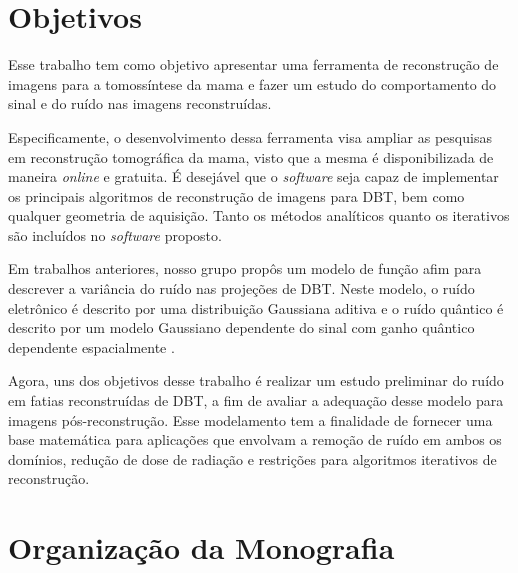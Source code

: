 
\section{Objetivos}

Esse trabalho tem como objetivo apresentar uma ferramenta de reconstrução de imagens para a tomossíntese da mama e fazer um estudo do comportamento do sinal e do ruído nas imagens reconstruídas.

Especificamente, o desenvolvimento dessa ferramenta visa ampliar as pesquisas em reconstrução tomográfica da mama, visto que a mesma é disponibilizada de maneira \textit{online} e gratuita. É desejável que o \textit{software} seja capaz de implementar os principais algoritmos de reconstrução de imagens para \acs{DBT}, bem como qualquer geometria de aquisição. Tanto os métodos analíticos quanto os iterativos são incluídos no \textit{software} proposto.

Em trabalhos anteriores, nosso grupo propôs um modelo de função afim para descrever a variância do ruído nas projeções de \acs{DBT}. Neste modelo, o ruído eletrônico é descrito por uma distribuição Gaussiana aditiva e o ruído quântico é descrito por um modelo Gaussiano dependente do sinal com ganho quântico dependente espacialmente \cite{borges2017method,borges2018restoration}. 

Agora, uns dos objetivos desse trabalho é realizar um estudo preliminar do ruído em fatias reconstruídas de \acs{DBT}, a fim de avaliar a adequação desse modelo para imagens pós-reconstrução. Esse modelamento tem a finalidade de fornecer uma base matemática para aplicações que envolvam a remoção de ruído em ambos os domínios, redução de dose de radiação e restrições para algoritmos iterativos de reconstrução.


\section{Organização da Monografia}

